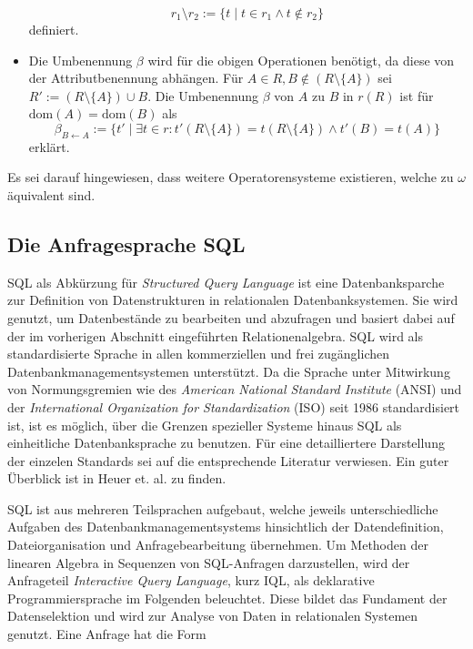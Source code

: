 \begin{itemize}
\begin{equation*}
        r_1 \setminus r_2:=\{ t \; | \; t \in r_1 \wedge t \notin r_2 \}
    \end{equation*}
    definiert.
    \item Die Umbenennung $\beta$ wird für die obigen Operationen benötigt, da diese von der Attributbenennung abhängen. Für $A \in R, B \notin (R \setminus \{A\})$ sei $R':=(R \setminus \{A\}) \cup B$. Die Umbenennung $\beta$ von $A$ zu $B$ in $r(R)$ ist für $\mathrm{dom}(A)=\mathrm{dom}(B)$ als
    \begin{equation*}
        \beta_{B \leftarrow A}:=\{t' \; | \; \exists t \in r: t'(R \setminus \{A\})=t(R \setminus \{A\}) \wedge t'(B)=t(A)\}
    \end{equation*}
    erklärt.
\end{itemize}
Es sei darauf hingewiesen, dass weitere Operatorensysteme existieren, welche zu $\omega$ äquivalent sind\cite{DBLP:books/daglib/0044627}.

\subsection{Die Anfragesprache SQL}
\label{abs:SQL_intro}
SQL als Abkürzung für \textit{Structured Query Language} ist eine Datenbanksparche zur Definition von Datenstrukturen in relationalen Datenbanksystemen. Sie wird genutzt, um Datenbestände zu bearbeiten und abzufragen und basiert dabei auf der im vorherigen Abschnitt eingeführten Relationenalgebra. SQL wird als standardisierte Sprache in allen kommerziellen und frei zugänglichen Datenbankmanagementsystemen unterstützt. Da die Sprache unter Mitwirkung von Normungsgremien wie des \textit{American National Standard Institute} (ANSI) und der \textit{International Organization for Standardization} (ISO) seit 1986 standardisiert ist, ist es möglich, über die Grenzen spezieller Systeme hinaus SQL als einheitliche Datenbanksprache zu benutzen. Für eine detailliertere Darstellung der einzelen Standards sei auf die entsprechende Literatur verwiesen. Ein guter Überblick ist in Heuer et. al.\cite{DBLP:books/daglib/0044627} zu finden.

SQL ist aus mehreren Teilsprachen aufgebaut, welche jeweils unterschiedliche Aufgaben des Datenbankmanagementsystems hinsichtlich der Datendefinition, Dateiorganisation und Anfragebearbeitung übernehmen. Um Methoden der linearen Algebra in Sequenzen von SQL-Anfragen darzustellen, wird der Anfrageteil \textit{Interactive Query Language}, kurz IQL, als deklarative Programmiersprache im Folgenden beleuchtet. Diese bildet das Fundament der Datenselektion und wird zur Analyse von Daten in relationalen Systemen genutzt. Eine Anfrage hat die Form 

